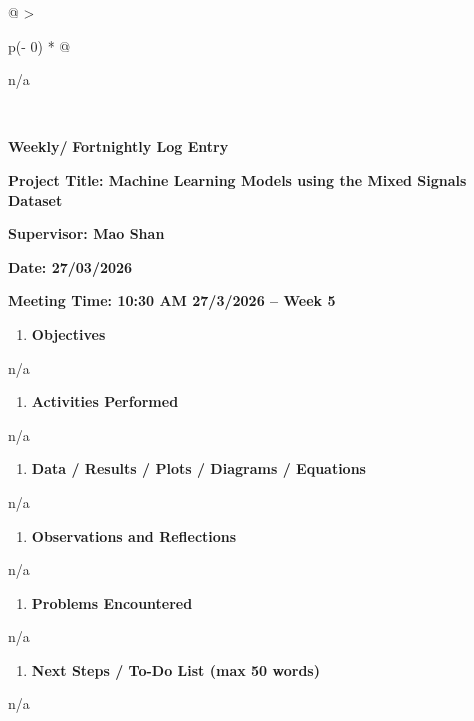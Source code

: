\begin{longtable}[]{@{}
  >{\raggedright\arraybackslash}p{(\columnwidth - 0\tabcolsep) * }@{}}
\begin{minipage}[t]{\linewidth}
n/a
\end{minipage} \\
\begin{minipage}[t]{\linewidth}\raggedright
\textbf{Weekly/} \textbf{Fortnightly Log Entry}

\textbf{Project Title: Machine Learning Models using the Mixed Signals
Dataset}

\textbf{Supervisor: Mao Shan}

\textbf{Date: 27/03/2026}

\textbf{Meeting Time: 10:30 AM 27/3/2026 -- Week 5}

\begin{enumerate}
\def\labelenumi{\arabic{enumi}.}
\item
  \textbf{Objectives}
\end{enumerate}

n/a

\begin{enumerate}
\def\labelenumi{\arabic{enumi}.}
\setcounter{enumi}{1}
\item
  \textbf{Activities Performed}
\end{enumerate}

n/a

\begin{enumerate}
\def\labelenumi{\arabic{enumi}.}
\setcounter{enumi}{2}
\item
  \textbf{Data / Results / Plots / Diagrams / Equations}
\end{enumerate}

n/a

\begin{enumerate}
\def\labelenumi{\arabic{enumi}.}
\setcounter{enumi}{3}
\item
  \textbf{Observations and Reflections}
\end{enumerate}

n/a

\begin{enumerate}
\def\labelenumi{\arabic{enumi}.}
\setcounter{enumi}{4}
\item
  \textbf{Problems Encountered}
\end{enumerate}

n/a

\begin{enumerate}
\def\labelenumi{\arabic{enumi}.}
\setcounter{enumi}{5}
\item
  \textbf{Next Steps / To-Do List (max 50 words)}
\end{enumerate}

n/a


\end{minipage}
\end{longtable}
